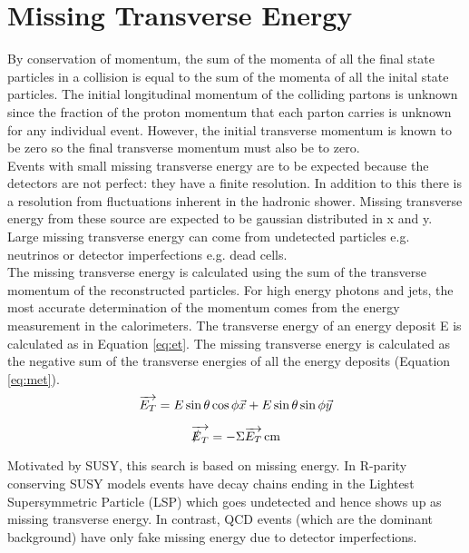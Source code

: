 \section{Missing Transverse Energy}

By conservation of momentum, the sum of the momenta of all the final state
particles in a collision is equal to the sum of the momenta of all the inital
state particles. The initial longitudinal momentum of the colliding partons is
unknown since the fraction of the proton momentum that each parton carries is
unknown for any individual event. However, the initial transverse momentum is
known to be zero so the final transverse momentum must also be to zero. \\

Events with small missing transverse energy are to be expected because the 
detectors are not perfect: they have a finite resolution. In addition to this
there is a resolution from fluctuations inherent in the hadronic shower. Missing
transverse energy from these source are expected to be gaussian distributed in x
and y. Large missing transverse energy can come from undetected particles e.g. 
neutrinos or detector imperfections e.g. dead cells. \\

The missing transverse energy is calculated using the sum of the transverse
momentum of the reconstructed particles. For high energy photons and jets, the 
most accurate determination of the momentum comes from the energy measurement in
the calorimeters. The transverse energy of an energy deposit E is calculated as 
in Equation \ref{eq:et}. The missing transverse energy is calculated as the
negative sum of the transverse energies of all the energy deposits (Equation
\ref{eq:met}). \\

\begin{equation}
\overrightarrow{E_{T}} = E\sin{\theta}\cos{\phi}\vec{x} + E\sin{\theta}\sin{\phi}\vec{y}
\label{eq:et}
\end{equation}

\begin{equation}
\overrightarrow{\slashed{E}_{T}} = - \Sigma \overrightarrow{E_{T}} \, \mathrm{cm}
\label{eq:met}
\end{equation}

Motivated by SUSY, this search is based on missing energy. In R-parity
conserving SUSY models events have decay chains ending in the Lightest 
Supersymmetric Particle (LSP) which goes undetected and hence shows up as 
missing transverse energy. In contrast, QCD events (which are the dominant 
background) have only fake missing energy due to detector imperfections. \\

